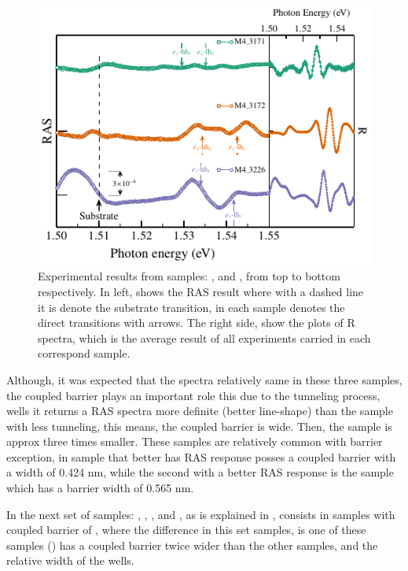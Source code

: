 \begin{figure}[t!]
	\centering
	\includegraphics[width=\textwidth]{../figures/chapter-3/ras-plots/build-ruco/ras-set-1.pdf}
	\caption{Experimental results from samples: ,  and , from top to bottom respectively. In left, shows the RAS result where with a dashed line it is denote the substrate transition, in each sample denotes the direct transitions with arrows. The right side, show the plots of R spectra, which is the average result of all experiments carried in each correspond sample.   }
	\label{fig:chapter-3-subsec-ras-plots-set-1}
\end{figure}
Although, it was  expected that the spectra relatively same in these three samples, the coupled barrier plays an important role this due to the tunneling process,  wells it returns a \gls{RAS} spectra more definite (better line-shape) than the sample with less tunneling, this means, the coupled barrier is wide. Then, the sample  is approx three times smaller. These samples are relatively common with barrier exception, in sample  that  better has \gls{RAS} response posses a coupled barrier with a width of 0.424 nm, while the second with a better RAS response is the sample  which has a barrier width of 0.565 nm.  

In the next set of samples: ,  ,  ,   and  , as  is explained in , consists in samples with coupled barrier of , where the difference in this set samples, is one  of these samples () has a coupled barrier  twice wider than the other samples, and the relative width of the wells. 


